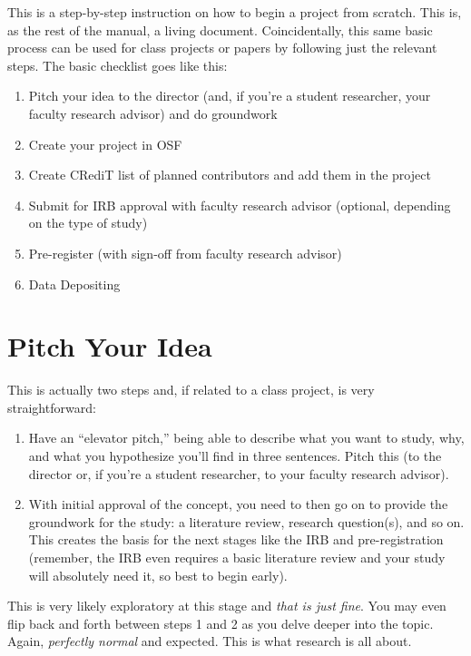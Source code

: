 \documentclass[]{tufte-book}
\providecommand{\tightlist}{%
  \setlength{\itemsep}{0pt}\setlength{\parskip}{0pt}}
\begin{document}
This is a step-by-step instruction on how to begin a project from scratch. This is, as the rest of the manual, a living document. Coincidentally, this same basic process can be used for class projects or papers by following just the relevant steps. The basic checklist goes like this:

\begin{enumerate}
\def\labelenumi{\arabic{enumi}.}
\tightlist
\item
  Pitch your idea to the director (and, if you're a student researcher, your faculty research advisor) and do groundwork
\item
  Create your project in OSF
\item
  Create CRediT list of planned contributors and add them in the project
\item
  Submit for IRB approval with faculty research advisor (optional, depending on the type of study)
\item
  Pre-register (with sign-off from faculty research advisor)
\item
  Data Depositing
\end{enumerate}

\hypertarget{pitch-your-idea}{%
\section{Pitch Your Idea}\label{pitch-your-idea}}

This is actually two steps and, if related to a class project, is very straightforward:

\begin{enumerate}
\def\labelenumi{\arabic{enumi}.}
\tightlist
\item
  Have an ``elevator pitch,'' being able to describe what you want to study, why, and what you hypothesize you'll find in three sentences. Pitch this (to the director or, if you're a student researcher, to your faculty research advisor).
\item
  With initial approval of the concept, you need to then go on to provide the groundwork for the study: a literature review, research question(s), and so on. This creates the basis for the next stages like the IRB and pre-registration (remember, the IRB even requires a basic literature review and your study will absolutely need it, so best to begin early).
\end{enumerate}

This is very likely exploratory at this stage and \emph{that is just fine}. You may even flip back and forth between steps 1 and 2 as you delve deeper into the topic. Again, \emph{perfectly normal} and expected. This is what research is all about.
\end{document}
